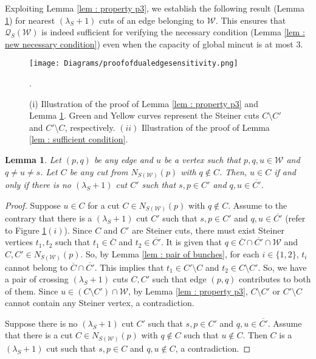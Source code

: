 \documentclass[letterpaper,11pt]{article}
\newtheorem{lemma}{Lemma}[]
\begin{document}
Exploiting Lemma \ref{lem : property p3}, we establish the following result (Lemma \ref{lem : necessary condition}) for nearest $(\lambda_S+1)$ cuts of an edge belonging to ${\mathcal W}$. This ensures that ${\mathcal Q}_S({\mathcal W})$ is indeed sufficient for verifying the necessary condition (Lemma \ref{lem : new necessary condition}) even when the capacity of global mincut is at most $3$.
\begin{figure}
 \centering
    \texttt{[image: Diagrams/proofofdualedgesensitivity.png]} 
   \caption{(i) Illustration of the proof of Lemma \ref{lem : property p3} and Lemma \ref{lem : necessary condition}. Green and Yellow curves represent the Steiner cuts $C\setminus C'$ and $C'\setminus C$, respectively. $(ii)$ Illustration of the proof of Lemma \ref{lem : sufficient condition}.}
  \label{fig : proof}. 
\end{figure}
\begin{lemma} \label{lem : necessary condition}
    Let $(p,q)$ be any edge and $u$ be a vertex such that $p,q,u\in {\mathcal W}$ and $q\ne u\ne s$. Let $C$ be any cut from $N_{S({\mathcal W})}(p)$ with $q\notin C$. Then, $u\in C$ if and only if there is no $(\lambda_S+1)$ cut $C'$ such that $s,p\in C'$ and $q,u\in \overline{C'}$.  
\end{lemma}
\begin{proof}
    Suppose $u\in C$ for a cut $C\in N_{S({\mathcal W})}(p)$ with $q\notin C$. Assume to the contrary that there is a $(\lambda_S+1)$ cut $C'$ such that $s,p\in C'$ and $q,u\in \overline{C'}$ (refer to Figure \ref{fig : proof}$(i)$). Since $C$ and $C'$ are Steiner cuts, there must exist Steiner vertices $t_1,t_2$ such that $t_1\in \overline{C}$ and $t_2\in \overline{C'}$. It is given that $q\in \overline{C}\cap \overline{C'}\cap {\mathcal W}$ and $C,C'\in N_{S({\mathcal W})}(p)$. So, by Lemma \ref{lem : pair of bunches}, for each $i\in \{1,2\}$, $t_i$ cannot belong to $\overline{C}\cap \overline{C'}$. This implies that $t_1\in C'\setminus C$ and $t_2\in C\setminus C'$. So, we have a pair of crossing $(\lambda_S+1)$ cuts $C,C'$ such that edge $(p,q)$ contributes to both of them. Since $u\in (C\setminus C')\cap {\mathcal W}$, by Lemma \ref{lem : property p3}, $C\setminus C'$ or $C'\setminus C$ cannot contain any Steiner vertex, a contradiction.

    Suppose there is no $(\lambda_S+1)$ cut $C'$ such that $s,p\in C'$ and $q,u\in \overline{C'}$. Assume that there is a cut $C\in N_{S({\mathcal W})}(p)$ with $q\notin C$ such that $u\notin C$. Then $C$ is a $(\lambda_S+1)$ cut such that $s,p\in C$ and $q,u\notin C$, a contradiction. 
\end{proof}
\end{document}
